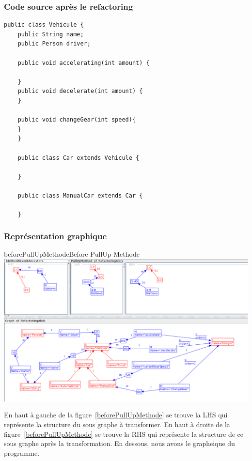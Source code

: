 \documentclass[a4paper, 12pt]{article}
\begin{document}
  \subsubsection{Code source après le refactoring}
  \begin{lstlisting}[frame=single]
    public class Vehicule {
    public String name;
    public Person driver;

    public void accelerating(int amount) {

    }
    public void decelerate(int amount) {
    }

    public void changeGear(int speed){
    }
    }

    public class Car extends Vehicule {

    }

    public class ManualCar extends Car {

    }
  \end{lstlisting}

  \subsubsection{Représentation graphique}

  \begin{myfig}{beforePullUpMethode}{Before PullUp Methode}
    \includegraphics[width=\textwidth]{beforePullUpMethode.png}
  \end{myfig}

  En haut à gauche de la figure~\ref{beforePullUpMethode} se trouve la LHS qui représente la structure du sous graphe à transformer.
  En haut à droite de la figure~\ref{beforePullUpMethode} se trouve la RHS qui représente la structure de ce sous graphe après la transformation.
  En dessous, nous avons le grapheique du programme.
\end{document}
